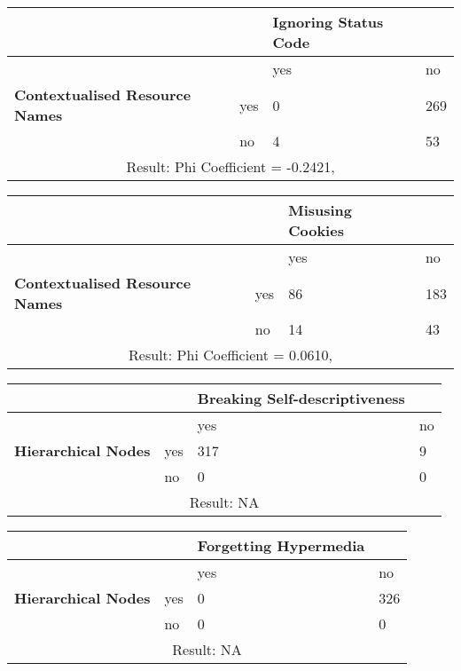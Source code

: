 \documentclass[a4paper,12pt]{article}
\begin{document}
\begin{center}
  \begin{tabular}{| p{60mm} | p{10mm} | p{35mm} | p{35mm} |}
  \hline
   & & \textbf{Ignoring Status Code} &
  \\
  \hline
  & & yes & no
  \\
  \hline
  \textbf{Contextualised Resource Names} & yes & 0 & 269
  \\
  \hline
   & no & 4 & 53
  \\
  \hline
  \multicolumn{4}{|c|}{Result: Phi Coefficient = -0.2421, }
  \\ \hline
  \end{tabular}
  \end{center}

\begin{center}
  \begin{tabular}{| p{60mm} | p{10mm} | p{35mm} | p{35mm} |}
  \hline
   & & \textbf{Misusing Cookies} &
  \\
  \hline
  & & yes & no
  \\
  \hline
  \textbf{Contextualised Resource Names} & yes & 86 & 183
  \\
  \hline
   & no & 14 & 43
  \\
  \hline
  \multicolumn{4}{|c|}{Result: Phi Coefficient = 0.0610, }
  \\ \hline
  \end{tabular}
  \end{center}

\begin{center}
  \begin{tabular}{| p{60mm} | p{10mm} | p{35mm} | p{35mm} |}
  \hline
   & & \textbf{Breaking Self-descriptiveness} &
  \\
  \hline
  & & yes & no
  \\
  \hline
  \textbf{Hierarchical Nodes} & yes & 317 & 9
  \\
  \hline
   & no & 0 & 0
  \\
  \hline
  \multicolumn{4}{|c|}{Result: NA}
  \\ \hline
  \end{tabular}
  \end{center}

\begin{center}
  \begin{tabular}{| p{60mm} | p{10mm} | p{35mm} | p{35mm} |}
  \hline
   & & \textbf{Forgetting Hypermedia} &
  \\
  \hline
  & & yes & no
  \\
  \hline
  \textbf{Hierarchical Nodes} & yes & 0 & 326
  \\
  \hline
   & no & 0 & 0
  \\
  \hline
  \multicolumn{4}{|c|}{Result: NA}
  \\ \hline
  \end{tabular}
  \end{center}
\end{document}
